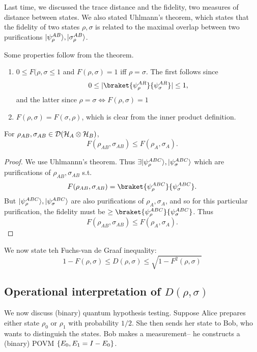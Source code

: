 Last time, we discussed the trace distance and the fidelity, two measures of distance between states. We also stated Uhlmann's theorem, which states that the fidelity of two states $\rho,\sigma$ is related to the maximal overlap between two purifications $\lvert\psi_\rho^{AB}\rangle,\lvert\sigma_\rho^{AB}\rangle$.

Some properties follow from the theorem.
\begin{enumerate}
    \item $0\leq F(\rho,\sigma \leq 1$ and $F(\rho,\sigma)=1$ iff $\rho=\sigma$. The first follows since
    \begin{equation*}
        0\leq \abs{\braket{\psi_\rho^{AR}}
        {\psi_\sigma^{AR}}} \leq 1,
    \end{equation*}
    and the latter since $\rho=\sigma \iff F(\rho,\sigma)=1$
    \item $F(\rho,\sigma)=F(\sigma,\rho)$, which is clear from the inner product definition.
\end{enumerate}
\begin{lem}
    For $\rho_{AB},\sigma_{AB}\in \mathcal{D}(\mathcal H_A\otimes \mathcal H_B)$,
    \begin{equation}
        F(\rho_{AB},\sigma_{AB})\leq F(\rho_A,\sigma_A).
    \end{equation}
\end{lem}
\begin{proof}
    We use Uhlmannn's theorem. Thus $\exists \lvert\psi_\rho^{ABC}\rangle,\lvert\psi_\sigma^{ABC}\rangle$ which are purifications of $\rho_{AB},\sigma_{AB}$ s.t.
    \begin{equation}
        F(\rho_{AB},\sigma_{AB}) =\braket{\psi_\rho^{ABC}}{\psi_\sigma^{ABC}}.
    \end{equation}
    But $\lvert\psi_\rho^{ABC}\rangle,\lvert\psi_\sigma^{ABC}\rangle$ are also purifications of $\rho_A,\sigma_A$, and so for this particular purification, the fidelity must be $\geq \braket{\psi_\rho^{ABC}}{\psi_\sigma^{ABC}}$. Thus
    \begin{equation}
        F(\rho_{AB},\sigma_{AB}) \leq F(\rho_A,\sigma_A).
    \end{equation}
\end{proof}

We now state teh Fuchs-van de Graaf inequality:
\begin{equation}
    1-F(\rho,\sigma)\leq D(\rho,\sigma) \leq \sqrt{1-F^2(\rho,\sigma)}
\end{equation}

\subsection*{Operational interpretation of $D(\rho,\sigma)$}
We now discuss (binary) quantum hypothesis testing. Suppose Alice prepares either state $\rho_0$ or $\rho_1$ with probability $1/2$. She then sends her state to Bob, who wants to distinguish the states. Bob makes a measurement-- he constructs a (binary) POVM $\{E_0,E_1=I-E_0\}$.


